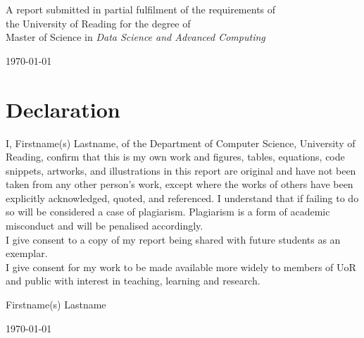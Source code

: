 \documentclass[a4paper,11pt,oneside]{book}
\begin{document}
\begin{titlepage}
\begin{center}
            \large A report submitted in partial fulfilment of the requirements of\\the University of Reading for the degree of\\
            Master of Science 
            in \textit{Data Science and Advanced Computing}\\[0.3cm] 
            \vfill
            
            
            \today %
        \end{center}
    \end{titlepage}
    
    
    \newpage
    \thispagestyle{empty}
    \chapter*{\Large Declaration}
    I,
     Firstname(s) Lastname, %
    of the Department of Computer Science, University of Reading, confirm that this is my own work and figures, tables, equations, code snippets, artworks, and illustrations in this report are original and have not been taken from any other person's work, except where the works of others have been explicitly acknowledged, quoted, and referenced. I understand that if failing to do so will be considered a case of plagiarism. Plagiarism is a form of academic misconduct and will be penalised accordingly. \\
    
    \noindent
    I give consent to a copy of my report being shared with future students as an exemplar. \\
    
    \noindent
    I give consent for my work to be made available more widely to members of UoR and public with interest in teaching, learning and research. 
    ~\\[1cm]
    \begin{flushright}
	Firstname(s) Lastname %
    
    \today
    \end{flushright}
\end{document}

